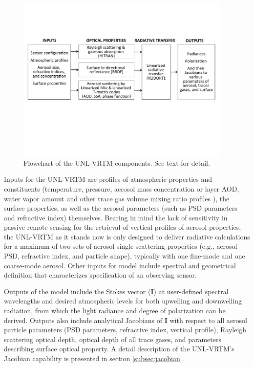 \begin{figure}[t]
  \centering
  \includegraphics[width={0.95\textwidth}]{figures/unlvrtm.pdf}
  \caption[Flowchart of the UNL-VRTM components.]
  {Flowchart of the UNL-VRTM components. See text for detail.}
  \label{fig:unlvrtm}
\end{figure}

Inputs for the UNL-VRTM are profiles of atmospheric properties and
constituents (temperature, pressure, aerosol mass concentration or layer
AOD, water vapor amount and other trace gas volume mixing ratio
profiles \citep{McClatchey72}), the surface properties, as well as 
the aerosol parameters  (such as PSD parameters and refractive index)
themselves. Bearing in mind the lack of
sensitivity in passive remote sensing for the retrieval of vertical
profiles of aerosol properties, the UNL-VRTM as it stands now is only
designed to deliver radiative calculations for a maximum of two sets of
aerosol single scattering properties (e.g., aerosol PSD,
refractive index, and particle shape), typically with one fine-mode and
one coarse-mode aerosol. Other inputs for model include spectral and
geometrical definition that characterizes specification of an
observing sensor. 

Outputs of the model include the Stokes vector ($\mathbf{I}$) at
user-defined spectral wavelengths and desired atmospheric
levels for both upwelling and downwelling radiation, from which the
light radiance and degree of polarization can be derived. Outputs also
include analytical Jacobians of $\mathbf{I}$ with respect to all aerosol
particle parameters (PSD parameters, refractive index, vertical profile), Rayleigh
scattering optical depth, optical depth of all trace gases, and
parameters describing surface optical property. A detail description of
the UNL-VRTM's Jacobian capability is presented in section
\ref{subsec:jacobian}. 


